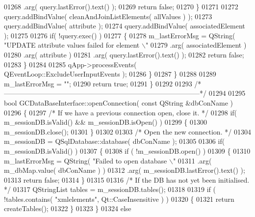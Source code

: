 \begin{DoxyCode}
{{{{{{{{{{{{{{{{{{{{{{{{{{{{{{{{{{{{{{{{{{{{{{{{01268                          .arg( query.lastError().text() );
01269         \textcolor{keywordflow}{return} \textcolor{keyword}{false};
01270       \}
01271 
01272       query.addBindValue( cleanAndJoinListElements( allValues ) );
01273       query.addBindValue( attribute );
01274       query.addBindValue( associatedElement );
01275 
01276       \textcolor{keywordflow}{if}( !query.exec() )
01277       \{
01278         m\_lastErrorMsg = QString( \textcolor{stringliteral}{"UPDATE attribute values failed for element 
      \(\backslash\)"%
01279                          .arg( associatedElement )
01280                          .arg( attribute )
01281                          .arg( query.lastError().text() );
01282         \textcolor{keywordflow}{return} \textcolor{keyword}{false};
01283       \}
01284 
01285       qApp->processEvents( QEventLoop::ExcludeUserInputEvents );
01286     \}
01287   \}
01288 
01289   m\_lastErrorMsg = \textcolor{stringliteral}{""};
01290   \textcolor{keywordflow}{return} \textcolor{keyword}{true};
01291 \}
01292 
01293 \textcolor{comment}{/*
      --------------------------------------------------------------------------------------*/}
01294 
01295 \textcolor{keywordtype}{bool} GCDataBaseInterface::openConnection( \textcolor{keyword}{const} QString &dbConName )
01296 \{
01297   \textcolor{comment}{/* If we have a previous connection open, close it. */}
01298   \textcolor{keywordflow}{if}( m\_sessionDB.isValid() && m\_sessionDB.isOpen() )
01299   \{
01300     m\_sessionDB.close();
01301   \}
01302 
01303   \textcolor{comment}{/* Open the new connection. */}
01304   m\_sessionDB = QSqlDatabase::database( dbConName );
01305 
01306   \textcolor{keywordflow}{if}( m\_sessionDB.isValid() )
01307   \{
01308     \textcolor{keywordflow}{if} ( !m\_sessionDB.open() )
01309     \{
01310       m\_lastErrorMsg = QString( \textcolor{stringliteral}{"Failed to open database \(\backslash\)"%
01311           .arg( m\_dbMap.value( dbConName ) )
01312           .arg( m\_sessionDB.lastError().text() );
01313       \textcolor{keywordflow}{return} \textcolor{keyword}{false};
01314     \}
01315 
01316     \textcolor{comment}{/* If the DB has not yet been initialised. */}
01317     QStringList tables = m\_sessionDB.tables();
01318 
01319     \textcolor{keywordflow}{if} ( !tables.contains( \textcolor{stringliteral}{"xmlelements"}, Qt::CaseInsensitive ) )
01320     \{
01321       \textcolor{keywordflow}{return} createTables();
01322     \}
01323   \}
01324   \textcolor{keywordflow}{else}
}}}}}}}}}}}}}}}}}}}}}}}}}}}}}}}}}}}}}}}}}}}}}}}}}}
\end{DoxyCode}

